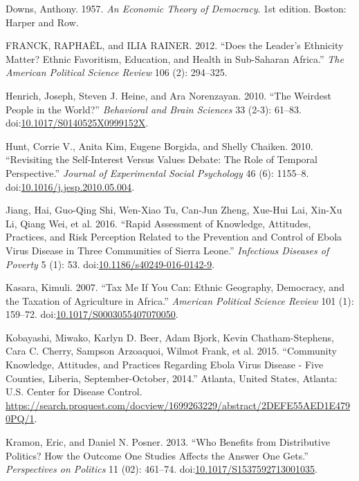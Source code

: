 \documentclass[]{article}
\begin{document}
\hypertarget{ref-downs_economic_1957}{}
Downs, Anthony. 1957. \emph{An Economic Theory of Democracy}. 1st
edition. Boston: Harper and Row.

\hypertarget{ref-franck_does_2012}{}
FRANCK, RAPHAËL, and ILIA RAINER. 2012. ``Does the Leader's Ethnicity
Matter? Ethnic Favoritism, Education, and Health in Sub-Saharan
Africa.'' \emph{The American Political Science Review} 106 (2):
294--325.

\hypertarget{ref-henrich_weirdest_2010}{}
Henrich, Joseph, Steven J. Heine, and Ara Norenzayan. 2010. ``The
Weirdest People in the World?'' \emph{Behavioral and Brain Sciences} 33
(2-3): 61--83.
doi:\href{https://doi.org/10.1017/S0140525X0999152X}{10.1017/S0140525X0999152X}.

\hypertarget{ref-hunt_revisiting_2010}{}
Hunt, Corrie V., Anita Kim, Eugene Borgida, and Shelly Chaiken. 2010.
``Revisiting the Self-Interest Versus Values Debate: The Role of
Temporal Perspective.'' \emph{Journal of Experimental Social Psychology}
46 (6): 1155--8.
doi:\href{https://doi.org/10.1016/j.jesp.2010.05.004}{10.1016/j.jesp.2010.05.004}.

\hypertarget{ref-jiang_rapid_2016}{}
Jiang, Hai, Guo-Qing Shi, Wen-Xiao Tu, Can-Jun Zheng, Xue-Hui Lai,
Xin-Xu Li, Qiang Wei, et al. 2016. ``Rapid Assessment of Knowledge,
Attitudes, Practices, and Risk Perception Related to the Prevention and
Control of Ebola Virus Disease in Three Communities of Sierra Leone.''
\emph{Infectious Diseases of Poverty} 5 (1): 53.
doi:\href{https://doi.org/10.1186/s40249-016-0142-9}{10.1186/s40249-016-0142-9}.

\hypertarget{ref-kasara_tax_2007}{}
Kasara, Kimuli. 2007. ``Tax Me If You Can: Ethnic Geography, Democracy,
and the Taxation of Agriculture in Africa.'' \emph{American Political
Science Review} 101 (1): 159--72.
doi:\href{https://doi.org/10.1017/S0003055407070050}{10.1017/S0003055407070050}.

\hypertarget{ref-kobayashi_community_2015}{}
Kobayashi, Miwako, Karlyn D. Beer, Adam Bjork, Kevin Chatham-Stephens,
Cara C. Cherry, Sampson Arzoaquoi, Wilmot Frank, et al. 2015.
``Community Knowledge, Attitudes, and Practices Regarding Ebola Virus
Disease - Five Counties, Liberia, September-October, 2014.'' Atlanta,
United States, Atlanta: U.S. Center for Disease Control.
\url{https://search.proquest.com/docview/1699263229/abstract/2DEFE55AED1E4790PQ/1}.

\hypertarget{ref-kramon_who_2013}{}
Kramon, Eric, and Daniel N. Posner. 2013. ``Who Benefits from
Distributive Politics? How the Outcome One Studies Affects the Answer
One Gets.'' \emph{Perspectives on Politics} 11 (02): 461--74.
doi:\href{https://doi.org/10.1017/S1537592713001035}{10.1017/S1537592713001035}.
\end{document}
